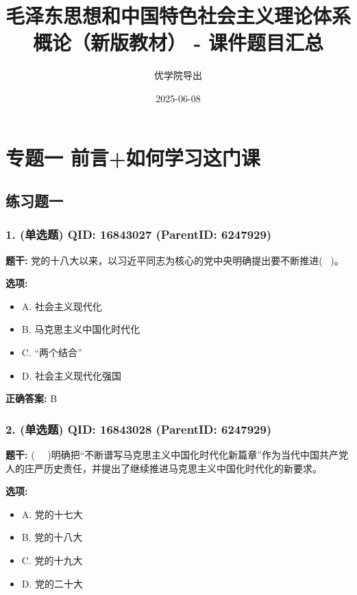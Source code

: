 \documentclass[12pt,UTF8]{ctexart}
\title{毛泽东思想和中国特色社会主义理论体系概论（新版教材） - 课件题目汇总}
\author{优学院导出}
\date{2025-06-08}
\begin{document}
\maketitle


\section*{专题一 前言+如何学习这门课}
\hrulefill

\subsection*{练习题一}

\subsubsection*{1. (单选题) \small QID: 16843027 (ParentID: 6247929)}

\textbf{题干:}
党的十八大以来，以习近平同志为核心的党中央明确提出要不断推进(  )。



\textbf{选项:}
\begin{itemize}[leftmargin=*]

  \item A. 社会主义现代化

  \item B. 马克思主义中国化时代化

  \item C. “两个结合”

  \item D. 社会主义现代化强国

\end{itemize}

\textbf{正确答案:}
B

\vspace{0.3em}\hrulefill\vspace{0.7em}

\subsubsection*{2. (单选题) \small QID: 16843028 (ParentID: 6247929)}

\textbf{题干:}
(   )明确把“不断谱写马克思主义中国化时代化新篇章”作为当代中国共产党人的庄严历史责任，并提出了继续推进马克思主义中国化时代化的新要求。



\textbf{选项:}
\begin{itemize}[leftmargin=*]

  \item A. 党的十七大

  \item B. 党的十八大

  \item C. 党的十九大

  \item D. 党的二十大

\end{itemize}
\end{document}
